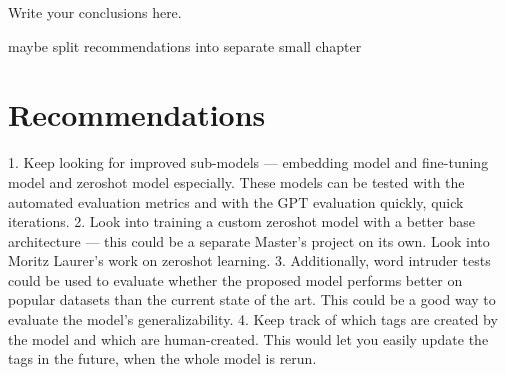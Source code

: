 Write your conclusions here.

maybe split recommendations into separate small chapter

\section{Recommendations}
1. Keep looking for improved sub-models — embedding model and fine-tuning model and zeroshot model especially. These models can be tested with the automated evaluation metrics and with the GPT evaluation quickly, quick iterations.
2. Look into training a custom zeroshot model with a better base architecture — this could be a separate Master's project on its own. Look into Moritz Laurer's work on zeroshot learning.
3. Additionally, word intruder tests could be used to evaluate whether the proposed model performs better on popular datasets than the current state of the art. This could be a good way to evaluate the model's generalizability.
4. Keep track of which tags are created by the model and which are human-created. This would let you easily update the tags in the future, when the whole model is rerun.